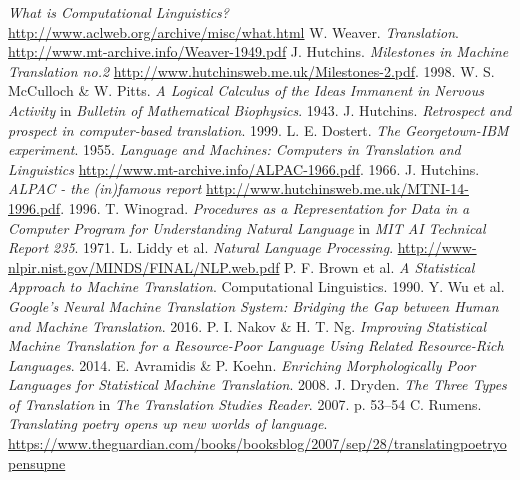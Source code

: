 \documentclass[a4,oneside,12pt,onecolumn]{extarticle}
\begin{document}
\begin{thebibliography}{10}
 {\it What is Computational Linguistics?}
  \url{http://www.aclweb.org/archive/misc/what.html}
 W. Weaver. {\it
    Translation}. \url{http://www.mt-archive.info/Weaver-1949.pdf}
 J. Hutchins. {\it Milestones in Machine Translation no.2}
  \url{http://www.hutchinsweb.me.uk/Milestones-2.pdf}. 1998.
 W. S. McCulloch \& W. Pitts. {\it A Logical Calculus of the Ideas Immanent in Nervous Activity} in {\it Bulletin of Mathematical
  Biophysics}. 1943. 
 J. Hutchins. {\it Retrospect and prospect in
    computer-based translation}. 1999.
 L. E. Dostert. {\it The Georgetown-IBM
    experiment}. 1955.
 {\it Language and Machines: Computers in Translation
    and Linguistics}
  \url{http://www.mt-archive.info/ALPAC-1966.pdf}. 1966.
 J. Hutchins. {\it ALPAC - the (in)famous report}
  \url{http://www.hutchinsweb.me.uk/MTNI-14-1996.pdf}. 1996.
 T. Winograd. {\it Procedures as a Representation for
    Data in a Computer Program for Understanding Natural Language} in
  {\it MIT AI Technical Report 235}. 1971.
 L. Liddy et al. {\it Natural Language
    Processing}. \url{http://www-nlpir.nist.gov/MINDS/FINAL/NLP.web.pdf}
 P. F. Brown et al. {\it A Statistical Approach to
    Machine Translation}. Computational Linguistics. 1990.
 Y. Wu et al. {\it Google's Neural Machine Translation
    System: Bridging the Gap between Human and Machine
    Translation}. 2016.
 P. I. Nakov \& H. T. Ng. {\it Improving Statistical
    Machine Translation for a Resource-Poor Language Using Related
    Resource-Rich Languages}. 2014.
 E. Avramidis \& P. Koehn. {\it Enriching Morphologically
    Poor Languages for Statistical Machine Translation}. 2008.
 J. Dryden. {\it The Three Types of Translation} in {\it
    The Translation Studies Reader}. 2007. p. 53--54
 C. Rumens. {\it Translating poetry opens up new worlds
    of language}.
  \url{https://www.theguardian.com/books/booksblog/2007/sep/28/translatingpoetryopensupne}


\end{thebibliography}
\end{document}
